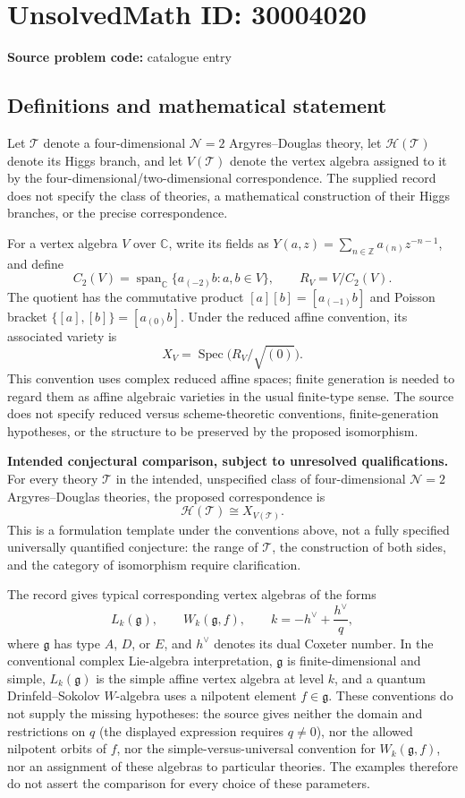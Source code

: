 \documentclass[11pt]{article}
\newcommand{\Z}{\mathbb{Z}}
\newcommand{\C}{\mathbb{C}}
\begin{document}
\section*{UnsolvedMath ID: 30004020}
\textbf{Source problem code:} catalogue entry
\subsection{Definitions and mathematical statement}
Let \(\mathcal T\) denote a four-dimensional \(\mathcal N=2\) Argyres--Douglas theory, let \(\mathcal H(\mathcal T)\) denote its Higgs branch, and let \(V(\mathcal T)\) denote the vertex algebra assigned to it by the four-dimensional/two-dimensional correspondence. The supplied record does not specify the class of theories, a mathematical construction of their Higgs branches, or the precise correspondence.

For a vertex algebra \(V\) over \(\C\), write its fields as \(Y(a,z)=\sum_{n\in\Z}a_{(n)}z^{-n-1}\), and define
\[
C_2(V)=\operatorname{span}_{\C}\{a_{(-2)}b:a,b\in V\},\qquad R_V=V/C_2(V).
\]
The quotient has the commutative product \([a][b]=[a_{(-1)}b]\) and Poisson bracket \(\{[a],[b]\}=[a_{(0)}b]\). Under the reduced affine convention, its associated variety is
\[
X_V=\operatorname{Spec}\bigl(R_V/\sqrt{(0)}\bigr).
\]
This convention uses complex reduced affine spaces; finite generation is needed to regard them as affine algebraic varieties in the usual finite-type sense. The source does not specify reduced versus scheme-theoretic conventions, finite-generation hypotheses, or the structure to be preserved by the proposed isomorphism.

\textbf{Intended conjectural comparison, subject to unresolved qualifications.} For every theory \(\mathcal T\) in the intended, unspecified class of four-dimensional \(\mathcal N=2\) Argyres--Douglas theories, the proposed correspondence is
\[
\mathcal H(\mathcal T)\cong X_{V(\mathcal T)}.
\]
This is a formulation template under the conventions above, not a fully specified universally quantified conjecture: the range of \(\mathcal T\), the construction of both sides, and the category of isomorphism require clarification.

The record gives typical corresponding vertex algebras of the forms
\[
L_k(\mathfrak g),\qquad W_k(\mathfrak g,f),\qquad k=-h^\vee+\frac{h^\vee}{q},
\]
where \(\mathfrak g\) has type \(A\), \(D\), or \(E\), and \(h^\vee\) denotes its dual Coxeter number. In the conventional complex Lie-algebra interpretation, \(\mathfrak g\) is finite-dimensional and simple, \(L_k(\mathfrak g)\) is the simple affine vertex algebra at level \(k\), and a quantum Drinfeld--Sokolov \(W\)-algebra uses a nilpotent element \(f\in\mathfrak g\). These conventions do not supply the missing hypotheses: the source gives neither the domain and restrictions on \(q\) (the displayed expression requires \(q\ne0\)), nor the allowed nilpotent orbits of \(f\), nor the simple-versus-universal convention for \(W_k(\mathfrak g,f)\), nor an assignment of these algebras to particular theories. The examples therefore do not assert the comparison for every choice of these parameters.
\end{document}

